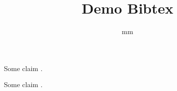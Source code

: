\documentclass{article}
\title{Demo Bibtex}
\author{mm}
\begin{document}
\maketitle

Some claim \cite{francq2015introduction}.





Some claim \cite{}.



\end{document}
